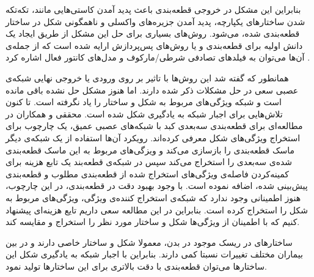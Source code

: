 بنابراین این مشکل در خروجی قطعه‌بندی باعث پدید آمدن کاستی‌هایی مانند، تکه‌تکه شدن ساختارهای یکپارچه، پدید آمدن جزیره‌های واکسلی و ناهمگونی شکل در ساختار قطعه‌بندی شده، می‌شود. روش‌های بسیاری برای حل این مشکل از طریق ایجاد یک دانش اولیه برای قطعه‌بندی و یا روش‌های پس‌پردازش ارایه شده است که از جمله‌ی آن‌ها می‌توان به فیلد‌های تصادفی شرطی/مارکوف و مدل‌های کانتور فعال اشاره کرد .

همانطور که گفته شد این روش‌ها با تاثیر بر روی ورودی یا خروجی نهایی شبکه‌ی عصبی سعی در حل مشکلات ذکر شده دارند. اما هنوز مشکل حل نشده باقی مانده است و شبکه ویژگی‌های مربوط به شکل و ساختار را یاد نگرفته است. تا کنون تلاش‌هایی برای اجبار شبکه به یادگیری شکل شده است. محققی و همکاران  در مطالعه‌ای برای قطعه‌بندی سه‌بعدی کبد با شبکه‌های عصبی عمیق، یک چارچوب برای استخراج ویژگی‌های شکل معرفی کرده‌اند. رویکرد آن‌ها استفاده از یک شبکه‌ی دیگر ماسک قطعه‌بندی را بازسازی می‌کند و ویزگی‌های مربوط به این ماسک قطعه‌بندی شده‌ی سه‌بعدی را استخراج می‌کند سپس در شبکه‌ی قطعه‌بند یک تابع هزینه برای کمینه‌کردن فاصله‌ی ویژگی‌های استخراج شده از قطعه‌بندی مطلوب و قطعه‌بندی پیش‌بینی شده، اضافه نموده است. با وجود بهبود دقت در قطعه‌بندی، در این چارچوب، هنوز اطمینانی وجود ندارد که شبکه‌ی استخراج کننده‌ی ویژگی، ویژگی‌های مربوط به شکل را استخراج کرده است. بنابراین در این مطالعه سعی داریم تایع هزینه‌ای پیشنهاد کنیم که با اطمینان از ویژگی‌ها شکل و ساختار مورد نظر را استخراج و مقایسه کند.

ساختارهای در ریسک موجود در بدن، معمولا شکل و ساختار خاصی دارند و در بین بیماران مختلف تغییرات نسبتا کمی دارند. بنابراین با اجبار شبکه به یادگیری شکل این ساختارها می‌توان قطعه‌بندی با دقت بالاتری برای این ساختارها تولید نمود. 






